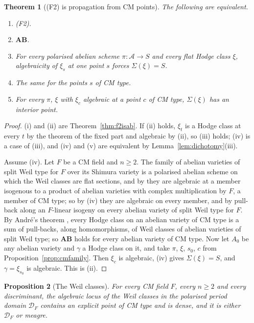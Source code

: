 \documentclass[11pt,reqno]{amsart}
\numberwithin{equation}{section}
\theoremstyle{plain}
\newtheorem{theorem}{Theorem}[section]
\newtheorem{proposition}[theorem]{Proposition}
\theoremstyle{definition}
\newcommand{\cD}{\mathcal{D}}
\newcommand{\cA}{\mathcal{A}}
\newcommand{\AB}{\mathbf{AB}}
\newcommand{\Fii}{\texorpdfstring{\textup{(F2)}}{(F2)}}
\begin{document}
\begin{theorem}[\Fii{} is propagation from CM points]\label{thm:propagation}
The following are equivalent.
\begin{enumerate}[label=\textup{(\roman*)},leftmargin=2.4em,itemsep=2pt]
\item \Fii{}.
\item $\AB$.
\item For every polarised abelian scheme $\pi\colon\cA\to S$ and every flat Hodge class $\xi$, algebraicity of $\xi_{s}$ at one point $s$ forces $\Sigma(\xi)=S$.
\item The same for the points $s$ of CM type.
\item For every $\pi$, $\xi$ with $\xi_{c}$ algebraic at a point $c$ of CM type, $\Sigma(\xi)$ has an interior point.
\end{enumerate}
\end{theorem}

\begin{proof}
(i) and (ii) are Theorem~\ref{thm:f2isab}. If (ii) holds, $\xi_{t}$ is a Hodge class at every $t$ by the theorem of the fixed part and algebraic by (ii), so (iii) holds; (iv) is a case of (iii), and (iv) and (v) are equivalent by Lemma~\ref{lem:dichotomy}(iii).

Assume (iv). Let $F$ be a CM field and $n\ge2$. The family of abelian varieties of split Weil type for $F$ over its Shimura variety is a polarised abelian scheme on which the Weil classes are flat sections, and by \cite[Thm.~1.1(i)]{BMB26} they are algebraic at a member isogenous to a product of abelian varieties with complex multiplication by $F$, a member of CM type; so by (iv) they are algebraic on every member, and by pull-back along an $F$-linear isogeny on every abelian variety of split Weil type for $F$. By Andr\'e's theorem \cite{And92cm}, every Hodge class on an abelian variety of CM type is a sum of pull-backs, along homomorphisms, of Weil classes of abelian varieties of split Weil type; so $\AB$ holds for every abelian variety of CM type. Now let $A_{0}$ be any abelian variety and $\gamma$ a Hodge class on it, and take $\pi$, $\xi$, $s_{0}$, $c$ from Proposition~\ref{prop:cmfamily}. Then $\xi_{c}$ is algebraic, (iv) gives $\Sigma(\xi)=S$, and $\gamma=\xi_{s_{0}}$ is algebraic. This is (ii).
\end{proof}

\begin{proposition}[The Weil classes]\label{prop:weil-dense}
For every CM field $F$, every $n\ge2$ and every discriminant, the algebraic locus of the Weil classes in the polarised period domain $\cD_{F}$ contains an explicit point of CM type and is dense, and it is either $\cD_{F}$ or meagre.
\end{proposition}
\end{document}
